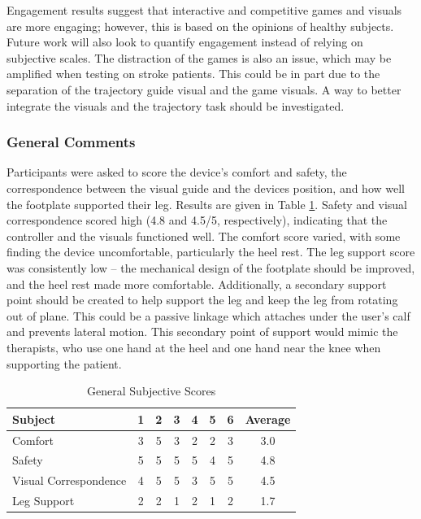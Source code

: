 \documentclass[12pt]{report}
\begin{document}
	Engagement results suggest that interactive and competitive games and visuals are more engaging; however, this is based on the opinions of healthy subjects. Future work will also look to quantify engagement instead of relying on subjective scales. The distraction of the games is also an issue, which may be amplified when testing on stroke patients. This could be in part due to the separation of the trajectory guide visual and the game visuals. A way to better integrate the visuals and the trajectory task should be investigated. 
	
	
\subsubsection{General Comments} \label{sec:general}
	
	Participants were asked to score the device's comfort and safety, the correspondence between the visual guide and the devices position, and how well the footplate supported their leg. Results are given in Table \ref{tab:general}. Safety and visual correspondence scored high (4.8 and 4.5/5, respectively), indicating that the controller and the visuals functioned well. The comfort score varied, with some finding the device uncomfortable, particularly the heel rest. The leg support score was consistently low -- the mechanical design of the footplate should be improved, and the heel rest made more comfortable. Additionally, a secondary support point should be created to help support the leg and keep the leg from rotating out of plane. This could be a passive linkage which attaches under the user's calf and prevents lateral motion. This secondary point of support would mimic the therapists, who use one hand at the heel and one hand near the knee when supporting the patient. 
	
	\begin{table}[h] \label{tab:general}
	\centering \doublespacing
	\caption{General Subjective Scores}
	\begin{tabular}{l c c c c c c c }
	\toprule
	Subject & 1 & 2 & 3 & 4 & 5 & 6 & Average \\
	\midrule
	\rowcolor{gray!10} Comfort & 3 & 5 & 3 & 2 & 2 & 3 & 3.0 \\
	Safety & 5 & 5 & 5 & 5 & 4 & 5 & 4.8 \\
	\rowcolor{gray!10} Visual Correspondence & 4 & 5 & 5 & 3 & 5 & 5 & 4.5 \\
	Leg Support & 2 & 2 & 1 & 2 & 1 & 2 & 1.7 \\
	\bottomrule
	\end{tabular}
	\end{table}
	
\end{document}
